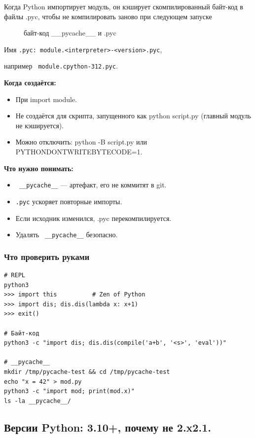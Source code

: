 Когда Python импортирует модуль, он кэширует скомпилированный байт-код в файлы .pyc, чтобы не компилировать заново при следующем запуске
\begin{figure}[htbp]
  \centering
  \resizebox{0.65\textwidth}{!}{}
  \caption{байт-код \_\_pycache\_\_ и .pyc}
  \label{fig:.байт-код и .pyc}
\end{figure}

Имя \texttt{.pyc: module.<interpreter>-<version>.pyc}, 

например \texttt{ module.cpython-312.pyc}.

\textbf{Когда создаётся:}
\begin{itemize}
\item При import module.
\item Не создаётся для скрипта, запущенного как python script.py (главный модуль не кэшируется).
\item Можно отключить: python -B script.py или PYTHONDONTWRITEBYTECODE=1.
\end{itemize}

\textbf{Что нужно понимать:}
\begin{itemize}
\item \texttt{ \_\_pycache\_\_} — артефакт, его не коммитят в git.
\item \texttt{.pyc} ускоряет повторные импорты.
\item Если исходник изменился, .pyc перекомпилируется.
\item Удалять \texttt{ \_\_pycache\_\_} безопасно.
\end{itemize}

\subsubsection{ Что проверить руками}
\begin{lstlisting}
# REPL
python3
>>> import this          # Zen of Python
>>> import dis; dis.dis(lambda x: x+1)
>>> exit()

# Байт-код
python3 -c "import dis; dis.dis(compile('a+b', '<s>', 'eval'))"

# __pycache__
mkdir /tmp/pycache-test && cd /tmp/pycache-test
echo "x = 42" > mod.py
python3 -c "import mod; print(mod.x)"
ls -la __pycache__/
\end{lstlisting}

\subsection{ Версии Python: 3.10+, почему не 2.x2.1.}
 
